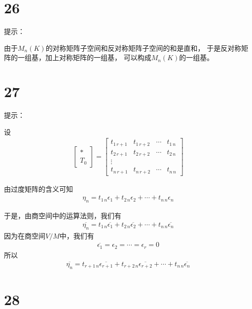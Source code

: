 \documentclass{article}
\begin{document}
\section*{26}

提示：

由于$M_n(K)$的对称矩阵子空间和反对称矩阵子空间的和是直和，
于是反对称矩阵的一组基，加上对称矩阵的一组基，
可以构成$M_n(K)$的一组基。

\section*{27}

提示：

设
\begin{align*}
  \begin{bmatrix}
    * \\
    T_0
  \end{bmatrix}
  = \begin{bmatrix}
      t_{1 \, r+1} & t_{1 \, r+2} & \cdots & t_{1 \, n} \\
      t_{2 \, r+1} & t_{2 \, r+2} & \cdots & t_{2 \, n} \\
      \vdots                                            \\
      t_{n \, r+1} & t_{n \, r+2} & \cdots & t_{n \, n}
    \end{bmatrix}
\end{align*}

由过度矩阵的含义可知
\begin{align*}
  \eta_n = t_{1 \, n} \epsilon_{1} + t_{2 \, n} \epsilon_{2} + \cdots + t_{n \, n} \epsilon_{n}
\end{align*}

于是，由商空间中的运算法则，我们有
\begin{align*}
  \overline{\eta_n} = t_{1 \, n} \overline{\epsilon_{1}} + t_{2 \, n} \overline{\epsilon_{2}} + \cdots + t_{n \, n} \overline{\epsilon_{n}}
\end{align*}
因为在商空间$V/M$中，我们有
\begin{align*}
  \overline{\epsilon_{1}} = \epsilon_{2} = \cdots = \epsilon_{r} = 0
\end{align*}
所以
\begin{align*}
  \overline{\eta_n} = t_{r + 1 \, n} \overline{\epsilon_{r + 1}} + t_{r + 2 \, n} \overline{\epsilon_{r + 2}} + \cdots + t_{n \, n} \overline{\epsilon_{n}}
\end{align*}

\section*{28}
\end{document}
